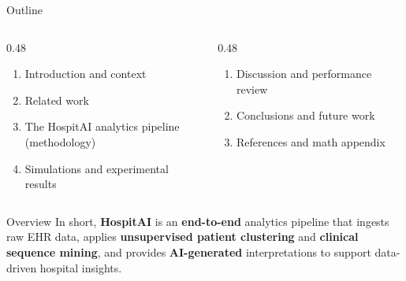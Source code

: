 \documentclass[aspectratio=169,11pt]{beamer}
\newcommand{\kw}[1]{{\color{hospaccent}\bfseries #1}}
\begin{document}
\begin{frame}{Outline}
  \vspace{0.5em}
  \begin{columns}[T]
    \begin{column}{0.48\textwidth}
      \begin{enumerate}
        \item[\textcolor{hospaccent}{\bfseries 1.}] Introduction and context
        \vspace{0.4em}
        \item[\textcolor{hospaccent}{\bfseries 2.}] Related work
        \vspace{0.4em}
        \item[\textcolor{hospaccent}{\bfseries 3.}] The HospitAI analytics pipeline\\
          {\footnotesize\color{hospgray} (methodology)}
        \vspace{0.4em}
        \item[\textcolor{hospaccent}{\bfseries 4.}] Simulations and experimental results
      \end{enumerate}
    \end{column}

    \begin{column}{0.48\textwidth}
      \begin{enumerate}
        \item[\textcolor{hospaccent}{\bfseries 5.}] Discussion and performance review
        \vspace{0.4em}
        \item[\textcolor{hospaccent}{\bfseries 6.}] Conclusions and future work
        \vspace{0.4em}
        \item[\textcolor{hospaccent}{\bfseries 7.}] References and math appendix
      \end{enumerate}
    \end{column}
  \end{columns}

  \vspace{0.35cm}

  \begin{block}{Overview}
    In short, \kw{HospitAI} is an \kw{end-to-end} analytics pipeline that ingests
    raw EHR data, applies \kw{unsupervised patient clustering} and
    \kw{clinical sequence mining}, and provides \kw{AI-generated}
    interpretations to support data-driven hospital insights.
  \end{block}
\end{frame}
\end{document}
